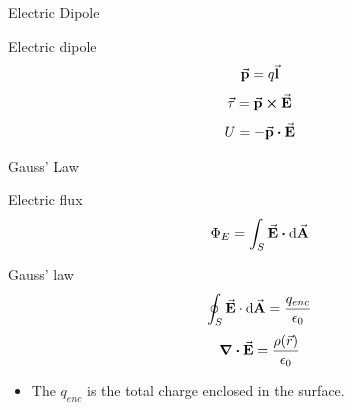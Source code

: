 \documentclass{beamer}
\begin{document}
\begin{frame}{Electric Dipole}
	\begin{figure}[htbp]
		\centering
	\end{figure}

	\begin{beamerboxesrounded}{Electric dipole}
        \begin{equation}
			\va{p} = q \va{l}
		\end{equation}
		\begin{equation}
			\va{\tau} = \va{p} \cp \va{E}
		\end{equation}
		\begin{equation}
			U = - \va{p} \vdot \va{E}
		\end{equation}
    \end{beamerboxesrounded}
\end{frame}

\begin{frame}{Gauss' Law}
	\begin{beamerboxesrounded}{Electric flux}
		\begin{equation}
			\Phi_E = \int_{S} \va{E} \vdot \dd{\va{A}}
		\end{equation}
	\end{beamerboxesrounded}
	\vspace{1em}
	\begin{beamerboxesrounded}{Gauss' law}
		\begin{equation}
			\oint_{S} \va{E} \cdot \dd{\va{A}} = \frac{q_{enc}}{\epsilon_0}
		\end{equation}
		\begin{equation}
			\div \va{E} = \frac{\rho(\vec{r})}{\epsilon_0}
		\end{equation}
	\end{beamerboxesrounded}
	\begin{itemize}
		\item The $q_{enc}$ is the total charge enclosed in the surface.
	\end{itemize}
\end{frame}
\end{document}
